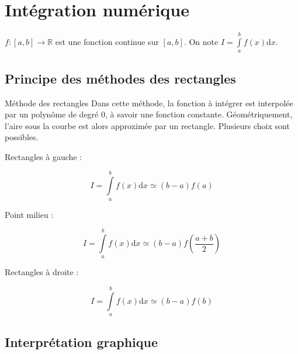 \section{Intégration numérique}

\begin{hypo}  $f:[a,b]\rightarrow \mathbb{R}$ est une fonction continue sur $[a,b]$. On note $I = \int\limits_a^{b} f(x) \mathrm{d}x $.
\end{hypo}

\subsection{Principe des méthodes des rectangles}
\begin{defi}{Méthode des rectangles}
Dans cette méthode, la fonction à intégrer est interpolée par un polynôme de degré 0, à savoir une fonction constante. Géométriquement, l'aire sous la courbe est alors approximée par un rectangle. Plusieurs choix sont possibles.

\begin{minipage}[c]{.3\linewidth}
Rectangles à gauche :

$$
I = \int\limits_a^{b} f(x) \mathrm{d}x \simeq \left(b-a\right) f(a) 
$$
\end{minipage}\hfill
\begin{minipage}[c]{.3\linewidth}
Point milieu :

$$
I = \int\limits_a^{b} f(x) \mathrm{d}x \simeq \left(b-a\right) f\left(\dfrac{a+b}{2}\right) 
$$
\end{minipage}\hfill
\begin{minipage}[c]{.3\linewidth}
Rectangles à droite :

$$
I = \int\limits_a^{b} f(x) \mathrm{d}x \simeq \left(b-a\right) f(b) 
$$
\end{minipage}
\end{defi}

\subsection{Interprétation graphique}

